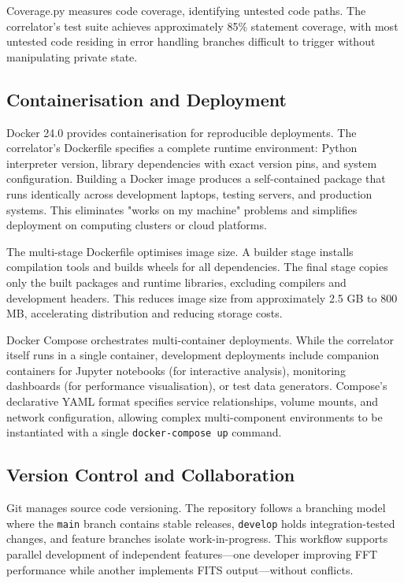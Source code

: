 Coverage.py measures code coverage, identifying untested code paths. The correlator's test suite achieves approximately 85\% statement coverage, with most untested code residing in error handling branches difficult to trigger without manipulating private state.

\subsection{Containerisation and Deployment}

Docker 24.0 provides containerisation for reproducible deployments. The correlator's Dockerfile specifies a complete runtime environment: Python interpreter version, library dependencies with exact version pins, and system configuration. Building a Docker image produces a self-contained package that runs identically across development laptops, testing servers, and production systems. This eliminates "works on my machine" problems and simplifies deployment on computing clusters or cloud platforms.

The multi-stage Dockerfile optimises image size. A builder stage installs compilation tools and builds wheels for all dependencies. The final stage copies only the built packages and runtime libraries, excluding compilers and development headers. This reduces image size from approximately 2.5 GB to 800 MB, accelerating distribution and reducing storage costs.

Docker Compose orchestrates multi-container deployments. While the correlator itself runs in a single container, development deployments include companion containers for Jupyter notebooks (for interactive analysis), monitoring dashboards (for performance visualisation), or test data generators. Compose's declarative YAML format specifies service relationships, volume mounts, and network configuration, allowing complex multi-component environments to be instantiated with a single \texttt{docker-compose up} command.

\subsection{Version Control and Collaboration}

Git manages source code versioning. The repository follows a branching model where the \texttt{main} branch contains stable releases, \texttt{develop} holds integration-tested changes, and feature branches isolate work-in-progress. This workflow supports parallel development of independent features—one developer improving FFT performance while another implements FITS output—without conflicts.

